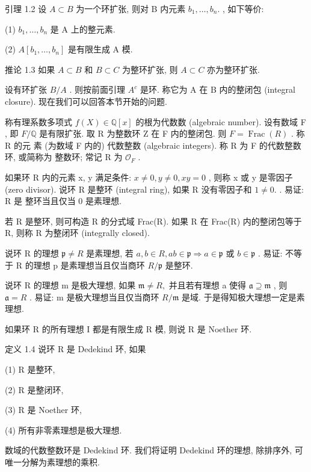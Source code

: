 \documentclass[]{article}
\begin{document}
{引理 1.2 设 $A \subset B$ 为一个环扩张, 则对 B 内元素 $b _ { 1 } , \ldots , b _ { n } .$ , 如下等价: 

(1) $b _ { 1 } , \ldots , b _ { n }$ 是 A 上的整元素. 

(2) $A [ b _ { 1 } , \ldots , b _ { n } ]$ 是有限生成 A 模. 

推论 1.3 如果 $A \subset B$ 和 $B \subset C$ 为整环扩张, 则 $A \subset C$ 亦为整环扩张. 

设有环扩张 $B / A$ . 则按前面引理 $A ^ { c }$ 是环. 称它为 A 在 B 内的整闭包 (integral closure). 现在我们可以回答本节开始的问题. 

称有理系数多项式 $f ( X ) \in \mathbb { Q } [ x ]$ 的根为代数数 (algebraic number). 设有数域 F , 即 $F / \mathbb { Q }$ 是有限扩张. 取 R 为整数环 Z 在 F 内的整闭包. 则 $F = \operatorname { F r a c } ( R )$ . 称 R 的元 素 (为数域 F 内的) 代数整数 (algebraic integers). 称 R 为 F 的代数整数环, 或简称为 整数环; 常记 R 为 ${ \mathcal { O } } _ { F }$ . 

如果环 R 内的元素 x, y 满足条件: $x \neq 0 , y \neq 0 , x y = 0$ , 则称 x 或 y 是零因子 (zero divisor). 说环 R 是整环 (integral ring), 如果 R 没有零因子和 $1 \neq 0 .$ . 易证: R 是 整环当且仅当 {0} 是素理想. 

若 R 是整环, 则可构造 R 的分式域 Frac(R). 如果 R 在 Frac(R) 内的整闭包等于 R, 则称 R 为整闭环 (integrally closed). 

说环 R 的理想 ${ \mathfrak { p } } \neq R$ 是素理想, 若 $a , b \in R , a b \in { \mathfrak { p } } \Rightarrow a \in { \mathfrak { p } }$ 或 $b \in { \mathfrak { p } }$ . 易证: 不等 于 R 的理想 p 是素理想当且仅当商环 $R / { \mathfrak { p } }$ 是整环. 

说环 R 的理想 m 是极大理想, 如果 ${ \mathfrak { m } } \neq R ,$ 并且若有理想 a 使得 ${ \mathfrak { a } } \supseteq { \mathfrak { m } }$ , 则 ${ \mathfrak { a } } = R$ . 易证: m 是极大理想当且仅当商环 $R / { \mathfrak { m } }$ 是域. 于是得知极大理想一定是素理想. 

如果环 R 的所有理想 I 都是有限生成 R 模, 则说 R 是 Noether 环. 

定义 1.4 说环 R 是 Dedekind 环, 如果 

(1) R 是整环, 

(2) R 是整闭环, 

(3) R 是 Noether 环, 

(4) 所有非零素理想是极大理想. 

数域的代数整数环是 Dedekind 环. 我们将证明 Dedekind 环的理想, 除排序外, 可 唯一分解为素理想的乘积. 

}
\end{document}
